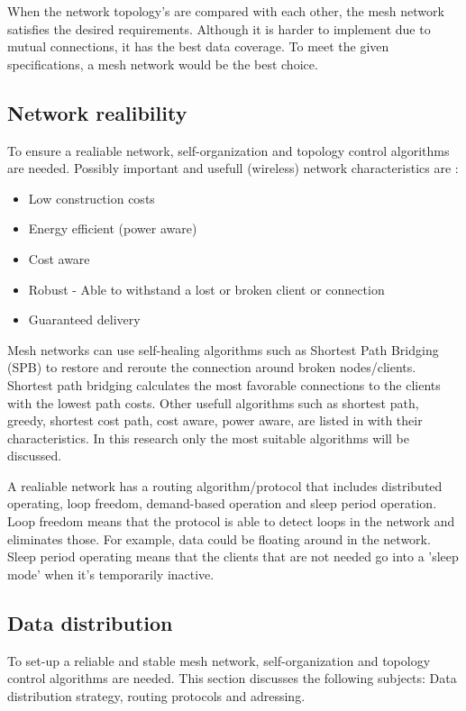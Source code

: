 \documentclass[10pt,a4paper]{article}
\begin{document}
When the network topology's are compared with each other, the mesh network satisfies the desired requirements. Although it is harder to implement due to mutual connections, it has the best data coverage. To meet the given specifications, a mesh network would be the best choice.

\newpage
\subsection{Network realibility}
To ensure a realiable network, self-organization and topology control algorithms are needed.\cite{WMN1} Possibly important and usefull (wireless) network characteristics are \cite{position-based}:
\begin{itemize}
\setlength\itemsep{0em}
    \item Low construction costs
    \item Energy efficient (power aware)
    \item Cost aware
    \item Robust - Able to withstand a lost or broken client or connection
    \item Guaranteed delivery
\end{itemize}

Mesh networks can use self-healing algorithms such as Shortest Path Bridging (SPB) to restore and reroute the connection around broken nodes/clients. Shortest path bridging calculates the most favorable connections to the clients with the lowest path costs. \cite{SPB} Other usefull algorithms such as shortest path, greedy, shortest cost path, cost aware, power aware, are listed in \cite{position-based} with their characteristics. In this research only the most suitable algorithms will be discussed. 

A realiable network has a routing algorithm/protocol that includes distributed operating, loop freedom, demand-based operation and sleep period operation. Loop freedom means that the protocol is able to detect loops in the network and eliminates those. For example, data could be floating around in the network. Sleep period operating means that the clients that are not needed go into a 'sleep mode' when it's temporarily inactive.\cite{position-based}

\newpage
\subsection{Data distribution}
To set-up a reliable and stable mesh network, self-organization and topology control algorithms are needed. \cite{WMN1}\cite{position-based} This section discusses the following subjects: Data distribution strategy, routing protocols and adressing.\\
\end{document}
